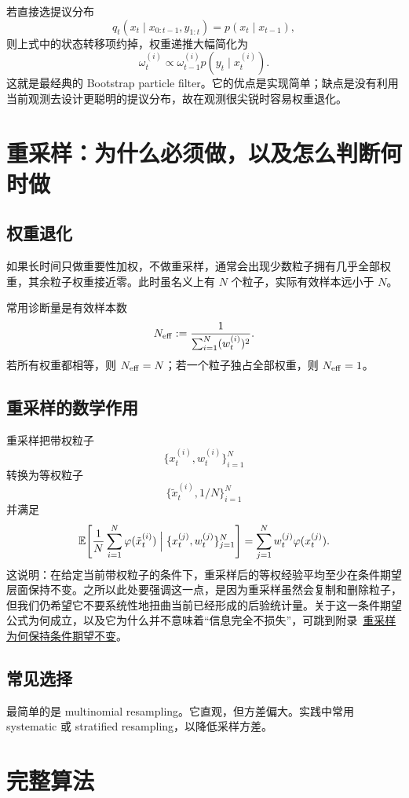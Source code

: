 \documentclass[12pt,a4paper]{ctexart}
\begin{document}
若直接选提议分布
\[
q_t(x_t \mid x_{0:t-1}, y_{1:t}) = p(x_t \mid x_{t-1}),
\]
则上式中的状态转移项约掉，权重递推大幅简化为
\[
\omega_t^{(i)} \propto \omega_{t-1}^{(i)} p(y_t \mid x_t^{(i)}).
\]
这就是最经典的 Bootstrap particle filter。它的优点是实现简单；缺点是没有利用当前观测去设计更聪明的提议分布，故在观测很尖锐时容易权重退化。

\section{重采样：为什么必须做，以及怎么判断何时做}

\subsection{权重退化}

如果长时间只做重要性加权，不做重采样，通常会出现少数粒子拥有几乎全部权重，其余粒子权重接近零。此时虽名义上有 \(N\) 个粒子，实际有效样本远小于 \(N\)。

常用诊断量是有效样本数
\[
N_{\mathrm{eff}}
:= \frac{1}{\sum_{i=1}^N (w_t^{(i)})^2}.
\]
若所有权重都相等，则 \(N_{\mathrm{eff}} = N\)；若一个粒子独占全部权重，则 \(N_{\mathrm{eff}} = 1\)。

\subsection{重采样的数学作用}

重采样把带权粒子
\[
\{x_t^{(i)}, w_t^{(i)}\}_{i=1}^N
\]
转换为等权粒子
\[
\{\tilde{x}_t^{(i)}, 1/N\}_{i=1}^N
\]
并满足
\[
\mathbb{E}\!\left[\frac{1}{N}\sum_{i=1}^N \varphi(\tilde{x}_t^{(i)})
\Bigm| \{x_t^{(j)},w_t^{(j)}\}_{j=1}^N \right]
= \sum_{j=1}^N w_t^{(j)} \varphi(x_t^{(j)}).
\]
这说明：在给定当前带权粒子的条件下，重采样后的等权经验平均至少在条件期望层面保持不变。之所以此处要强调这一点，是因为重采样虽然会复制和删除粒子，但我们仍希望它不要系统性地扭曲当前已经形成的后验统计量。关于这一条件期望公式为何成立，以及它为什么并不意味着“信息完全不损失”，可跳到附录~\hyperref[app:resampling-unbiased]{重采样为何保持条件期望不变}。

\subsection{常见选择}

最简单的是 multinomial resampling。它直观，但方差偏大。实践中常用 systematic 或 stratified resampling，以降低采样方差。

\section{完整算法}
\end{document}
